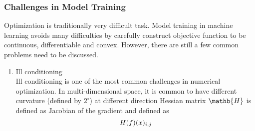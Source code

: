 \subsubsection{Challenges in Model Training}

Optimization is traditionally very difficult task. Model training in machine learning avoids many difficulties by carefully construct objective function to be continuous, differentiable and convex. However, there are still a few common problems need to be discussed. 

\begin{enumerate}
    \item Ill conditioning\\
Ill conditioning is one of the most common challenges in numerical optimization. In multi-dimensional space, it is common to have different curvature (defined by $2^\circ$) at different direction
Hessian matrix $\mathb{H}$ is defined as Jacobian of the gradient and defined as 
\begin{equation}
    \mathnormal{H}(f)(x)_{i,j}
\end{equation}
\end{enumerate}

